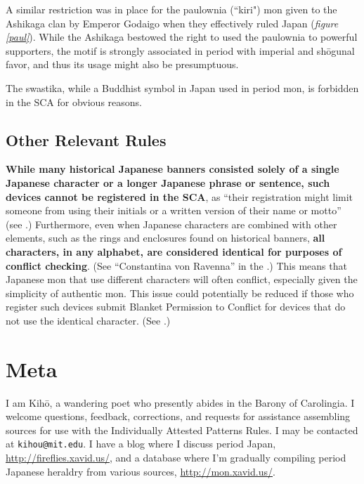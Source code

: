 \documentclass{article}
\begin{document}
  A similar restriction was in place for the paulownia (``kiri") mon
  given to the Ashikaga clan by Emperor Godaigo when they effectively
  ruled Japan (\emph{figure \ref{paul}}).  While the Ashikaga bestowed the right to used the
  paulownia to powerful supporters, the motif is strongly associated
  in period with imperial and shōgunal favor, and thus its usage might
  also be presumptuous.

  The swastika, while a Buddhist symbol in Japan used in
  period mon, is forbidden in the SCA for obvious reasons.

\subsection{Other Relevant Rules}

  \textbf{While many historical Japanese banners consisted solely of a single
  Japanese character or a longer Japanese phrase or sentence, such
  devices cannot be registered in the SCA}, as ``their registration
  might limit someone from using their initials or a written version
  of their name or motto'' (see
  .)
  Furthermore, even when Japanese characters are combined with other
  elements, such as the rings and enclosures found on historical
  banners, \textbf{all characters, in any alphabet, are considered identical
  for purposes of conflict checking}. (See ``Constantina von Ravenna''
  in the .)  This means that Japanese mon that use different
  characters will often conflict, especially given the simplicity of
  authentic mon.  This issue could potentially be reduced if those who
  register such devices submit Blanket Permission to Conflict for
  devices that do not use the identical character.  (See 
  .)

\section{Meta}

  I am Kih\=o, a wandering poet who presently abides in the Barony of
  Carolingia.  I welcome questions, feedback, corrections, and requests for
  assistance assembling sources for use with the Individually Attested
  Patterns Rules.  I may be contacted
  at \texttt{kihou@mit.edu}.  I have a blog where I discuss
  period Japan, \url{http://fireflies.xavid.us/}, and a database where I'm
  gradually compiling period Japanese heraldry from various sources,
  \url{http://mon.xavid.us/}.
\end{document}
